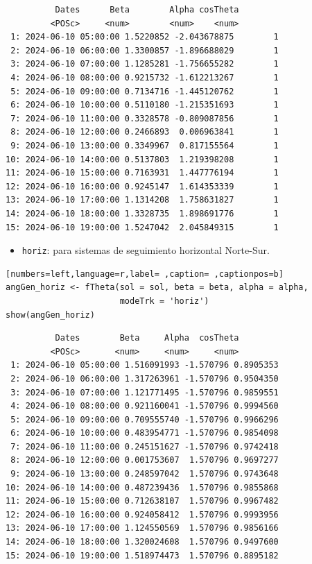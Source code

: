 \begin{itemize}
\begin{verbatim}
		  Dates      Beta        Alpha cosTheta
		 <POSc>     <num>        <num>    <num>
 1: 2024-06-10 05:00:00 1.5220852 -2.043678875        1
 2: 2024-06-10 06:00:00 1.3300857 -1.896688029        1
 3: 2024-06-10 07:00:00 1.1285281 -1.756655282        1
 4: 2024-06-10 08:00:00 0.9215732 -1.612213267        1
 5: 2024-06-10 09:00:00 0.7134716 -1.445120762        1
 6: 2024-06-10 10:00:00 0.5110180 -1.215351693        1
 7: 2024-06-10 11:00:00 0.3328578 -0.809087856        1
 8: 2024-06-10 12:00:00 0.2466893  0.006963841        1
 9: 2024-06-10 13:00:00 0.3349967  0.817155564        1
10: 2024-06-10 14:00:00 0.5137803  1.219398208        1
11: 2024-06-10 15:00:00 0.7163931  1.447776194        1
12: 2024-06-10 16:00:00 0.9245147  1.614353339        1
13: 2024-06-10 17:00:00 1.1314208  1.758631827        1
14: 2024-06-10 18:00:00 1.3328735  1.898691776        1
15: 2024-06-10 19:00:00 1.5247042  2.045849315        1
\end{verbatim}

\begin{itemize}
\item \texttt{horiz}: para sistemas de seguimiento horizontal Norte-Sur.
\end{itemize}
\begin{lstlisting}[numbers=left,language=r,label= ,caption= ,captionpos=b]
angGen_horiz <- fTheta(sol = sol, beta = beta, alpha = alpha,
                       modeTrk = 'horiz')
show(angGen_horiz)
\end{lstlisting}

\begin{verbatim}
		  Dates        Beta     Alpha  cosTheta
		 <POSc>       <num>     <num>     <num>
 1: 2024-06-10 05:00:00 1.516091993 -1.570796 0.8905353
 2: 2024-06-10 06:00:00 1.317263961 -1.570796 0.9504350
 3: 2024-06-10 07:00:00 1.121771495 -1.570796 0.9859551
 4: 2024-06-10 08:00:00 0.921160041 -1.570796 0.9994560
 5: 2024-06-10 09:00:00 0.709555740 -1.570796 0.9966296
 6: 2024-06-10 10:00:00 0.483954771 -1.570796 0.9854098
 7: 2024-06-10 11:00:00 0.245151627 -1.570796 0.9742418
 8: 2024-06-10 12:00:00 0.001753607  1.570796 0.9697277
 9: 2024-06-10 13:00:00 0.248597042  1.570796 0.9743648
10: 2024-06-10 14:00:00 0.487239436  1.570796 0.9855868
11: 2024-06-10 15:00:00 0.712638107  1.570796 0.9967482
12: 2024-06-10 16:00:00 0.924058412  1.570796 0.9993956
13: 2024-06-10 17:00:00 1.124550569  1.570796 0.9856166
14: 2024-06-10 18:00:00 1.320024608  1.570796 0.9497600
15: 2024-06-10 19:00:00 1.518974473  1.570796 0.8895182
\end{verbatim}


\end{itemize}
